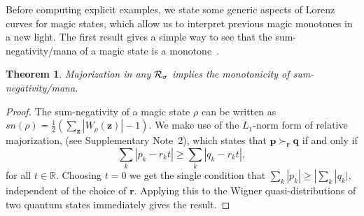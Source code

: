 \documentclass[
onecolumn,
superscriptaddress
]{revtex4-1}
\newcommand{\revhigh}[1]{{\color{red}#1}}
\newtheorem{theorem}{Theorem}
\def\z{\boldsymbol{z}}
\def\r{\boldsymbol{r}}
\def\p{\boldsymbol{p}}
\def\q{\boldsymbol{q}}
\def\q{\boldsymbol{q}}
\def\R{{\cal R}}
\begin{document}
\revhigh{Before computing explicit examples,} we state some generic aspects of Lorenz curves for magic states, which allow us to interpret previous magic monotones in a new light. The first result gives a simple way to see that the sum-negativity/mana of a magic state is a monotone~\cite{cit:veitch2}.

\begin{theorem} Majorization in any $\R_\sigma$ implies the monotonicity of sum-negativity/mana. 
\end{theorem}
\begin{proof}
	The sum-negativity of a magic state $\rho$ can be written as $sn(\rho) =\frac{1}{2} (\sum_{\z} |W_\rho(\z) | - 1)$.
We make use of the $L_1$-norm form of relative majorization, (see Supplementary Note~2), which states that $\p \succ_{\r} \q$ if and only if
	\begin{equation}
\sum_k | p_k - r_k t | \geq \sum_k | q_k - r_k t |,
\end{equation}
for all $t\in \mathbb{R}$. Choosing $t=0$ we get the single condition that $\sum_k |p_k| \ge |\sum_k |q_k|$, independent of the choice of $\r$. Applying this to the Wigner quasi-distributions of two quantum states immediately gives the result.
\end{proof}
\end{document}

